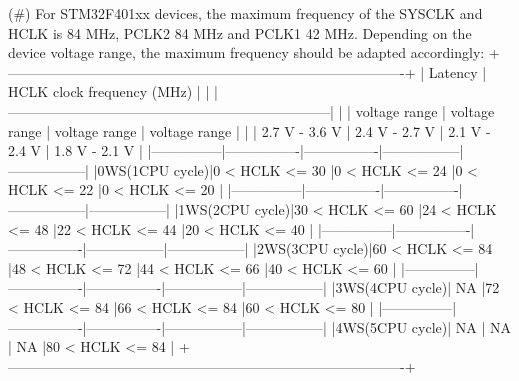 \begin{DoxyVerb}
      (#) For STM32F401xx devices, the maximum frequency of the SYSCLK and HCLK is 84 MHz, 
          PCLK2 84 MHz and PCLK1 42 MHz. Depending on the device voltage range, the maximum 
          frequency should be adapted accordingly:
 +-------------------------------------------------------------------------------------+
 | Latency       |                HCLK clock frequency (MHz)                           |
 |               |---------------------------------------------------------------------|
 |               | voltage range  | voltage range  | voltage range   | voltage range   |
 |               | 2.7 V - 3.6 V  | 2.4 V - 2.7 V  | 2.1 V - 2.4 V   | 1.8 V - 2.1 V   |
 |---------------|----------------|----------------|-----------------|-----------------|
 |0WS(1CPU cycle)|0 < HCLK <= 30  |0 < HCLK <= 24  |0 < HCLK <= 22   |0 < HCLK <= 20   |
 |---------------|----------------|----------------|-----------------|-----------------|
 |1WS(2CPU cycle)|30 < HCLK <= 60 |24 < HCLK <= 48 |22 < HCLK <= 44  |20 < HCLK <= 40  |
 |---------------|----------------|----------------|-----------------|-----------------|
 |2WS(3CPU cycle)|60 < HCLK <= 84 |48 < HCLK <= 72 |44 < HCLK <= 66  |40 < HCLK <= 60  |
 |---------------|----------------|----------------|-----------------|-----------------|
 |3WS(4CPU cycle)|      NA        |72 < HCLK <= 84 |66 < HCLK <= 84  |60 < HCLK <= 80  |
 |---------------|----------------|----------------|-----------------|-----------------|
 |4WS(5CPU cycle)|      NA        |      NA        |      NA         |80 < HCLK <= 84  |
 +-------------------------------------------------------------------------------------+


\end{DoxyVerb}
